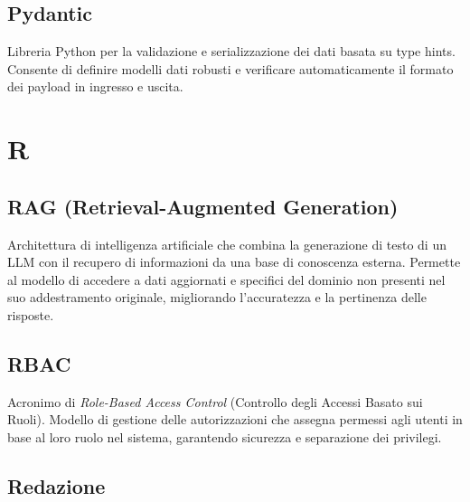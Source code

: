 \documentclass[a4paper, 11pt, oneside]{scrartcl} %
\begin{document}
\vspace{0.5cm}

\subsection*{Pydantic}
Libreria Python per la validazione e serializzazione dei dati basata su type hints. Consente di definire modelli dati robusti e verificare automaticamente il formato dei payload in ingresso e uscita.
\vspace{0.5cm}


\section*{R}


\subsection*{RAG (Retrieval-Augmented Generation)}
Architettura di intelligenza artificiale che combina la generazione di testo di un LLM con il recupero di informazioni da una base di conoscenza esterna. Permette al modello di accedere a dati aggiornati e specifici del dominio non presenti nel suo addestramento originale, migliorando l'accuratezza e la pertinenza delle risposte.
\vspace{0.5cm}


\subsection*{RBAC}


Acronimo di \textit{Role-Based Access Control} (Controllo degli Accessi Basato sui Ruoli). Modello di gestione delle autorizzazioni che assegna permessi agli utenti in base al loro ruolo nel sistema, garantendo sicurezza e separazione dei privilegi.

\vspace{0.5cm}

\subsection*{Redazione}

\end{document}
